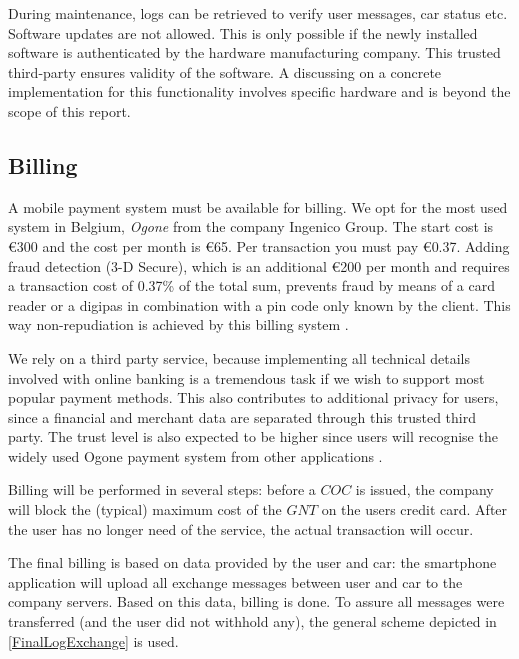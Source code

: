 During maintenance, logs can be retrieved to verify user messages, car status etc. Software updates are not allowed. This is only possible if the newly installed software is authenticated by the hardware manufacturing company. This trusted third-party ensures validity of the software. A discussing on a concrete implementation for this functionality involves specific hardware and is beyond the scope of this report.

\subsection{Billing}

A mobile payment system must be available for billing. We opt for the most used system in Belgium, \emph{Ogone} from the company Ingenico Group. The start cost is \euro{300} and the cost per month is \euro{65}. Per transaction you must pay \euro{0.37}. Adding fraud detection (3-D Secure), which is an additional \euro{200} per month and requires a transaction cost of 0.37\% of the total sum, prevents fraud by means of a card reader or a digipas in combination with a pin code only known by the client. This way non-repudiation is achieved by this billing system \cite{Ogone,Newance}.

We rely on a third party service, because implementing all technical details involved with online banking is a tremendous task if we wish to support most popular payment methods. This also contributes to additional privacy for users, since a financial and merchant data are separated through this trusted third party. The trust level is also expected to be higher since users will recognise the widely used Ogone payment system from other applications \cite{Billing-General}.

Billing will be performed in several steps: before a $COC$ is issued, the company will block the (typical) maximum cost of the $GNT$ on the users credit card. After the user has no longer need of the service, the actual transaction will occur.

The final billing is based on data provided by the user and car: the smartphone application will upload all exchange messages between user and car to the company servers. Based on this data, billing is done. To assure all messages were transferred (and the user did not withhold any), the general scheme depicted in \cref{FinalLogExchange} is used.

